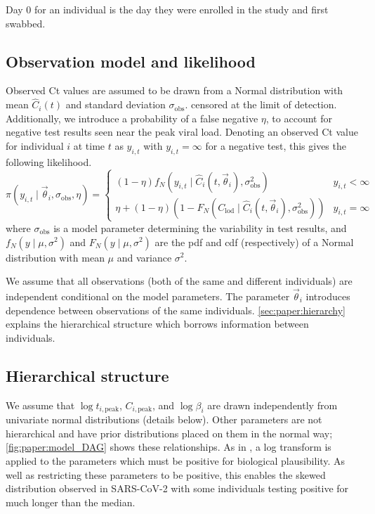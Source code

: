 \documentclass[thesis.tex]{subfiles}
\begin{document}
Day 0 for an individual is the day they were enrolled in the study and first swabbed.

\subsection{Observation model and likelihood}

Observed Ct values are assumed to be drawn from a Normal distribution with mean $\hat{C}_i(t)$ and standard deviation $\sigma_\text{obs}$.
censored at the limit of detection.
Additionally, we introduce a probability of a false negative $\eta$, to account for negative test results seen near the peak viral load.
Denoting an observed Ct value for individual $i$ at time $t$ as $y_{i,t}$ with
$y_{i,t} = \infty$ for a negative test, this gives the following likelihood.
$$
\pi(y_{i,t} \mid \vec\theta_i, \sigma_\text{obs}, \eta) = \begin{cases}
  (1 - \eta) f_N(y_{i,t} \mid \hat{C}_i(t, \vec\theta_i), \sigma_\text{obs}^2) &y_{i,t} < \infty \\
  \eta + (1 - \eta) (1 - F_N(C_\text{lod} \mid \hat{C}_i(t, \vec\theta_i), \sigma_\text{obs}^2)) & y_{i,t} = \infty
\end{cases}
$$
where $\sigma_\text{obs}$ is a model parameter determining the variability in
test results, and $f_N(y \mid \mu, \sigma^2)$ and $F_N(y \mid \mu, \sigma^2)$ are the pdf
and cdf (respectively) of a Normal distribution with mean $\mu$ and variance $\sigma^2$.

We assume that all observations (both of the same and different individuals) are independent conditional on the model parameters.
The parameter $\vec\theta_i$ introduces dependence between observations of the same individuals.
\autoref{sec:paper:hierarchy} explains the hierarchical structure which borrows information between individuals.

\subsection{Hierarchical structure}\label{sec:paper:hierarchy}

We assume that $\log t_{i,\text{peak}}$, $C_{i,\text{peak}}$, and $\log \beta_i$ are drawn independently from univariate normal distributions (details below).
Other parameters are not hierarchical and have prior distributions placed on them in the normal way; \autoref{fig:paper:model_DAG} shows these relationships.
As in \textcite{fogartyBayesian}, a log transform is applied to the parameters which must be positive for biological plausibility.
As well as restricting these parameters to be positive, this enables the skewed distribution observed in SARS-CoV-2 with some individuals testing positive for much longer than the median.
\end{document}
